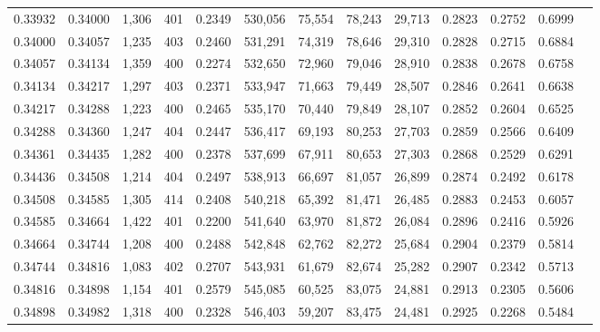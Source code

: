 \begin{tabular}{rrrrrrrrrrrrr}
0.33932 & 0.34000 &  1,306 & 401 &                                     0.2349 & 530,056 &  75,554 &  78,243 &  29,713 & 0.2823 & 0.2752 & 0.6999 \\
0.34000 & 0.34057 &  1,235 & 403 &                                     0.2460 & 531,291 &  74,319 &  78,646 &  29,310 & 0.2828 & 0.2715 & 0.6884 \\
0.34057 & 0.34134 &  1,359 & 400 &                                     0.2274 & 532,650 &  72,960 &  79,046 &  28,910 & 0.2838 & 0.2678 & 0.6758 \\
0.34134 & 0.34217 &  1,297 & 403 &                                     0.2371 & 533,947 &  71,663 &  79,449 &  28,507 & 0.2846 & 0.2641 & 0.6638 \\
0.34217 & 0.34288 &  1,223 & 400 &                                     0.2465 & 535,170 &  70,440 &  79,849 &  28,107 & 0.2852 & 0.2604 & 0.6525 \\
0.34288 & 0.34360 &  1,247 & 404 &                                     0.2447 & 536,417 &  69,193 &  80,253 &  27,703 & 0.2859 & 0.2566 & 0.6409 \\
0.34361 & 0.34435 &  1,282 & 400 &                                     0.2378 & 537,699 &  67,911 &  80,653 &  27,303 & 0.2868 & 0.2529 & 0.6291 \\
0.34436 & 0.34508 &  1,214 & 404 &                                     0.2497 & 538,913 &  66,697 &  81,057 &  26,899 & 0.2874 & 0.2492 & 0.6178 \\
0.34508 & 0.34585 &  1,305 & 414 &                                     0.2408 & 540,218 &  65,392 &  81,471 &  26,485 & 0.2883 & 0.2453 & 0.6057 \\
0.34585 & 0.34664 &  1,422 & 401 &                                     0.2200 & 541,640 &  63,970 &  81,872 &  26,084 & 0.2896 & 0.2416 & 0.5926 \\
0.34664 & 0.34744 &  1,208 & 400 &                                     0.2488 & 542,848 &  62,762 &  82,272 &  25,684 & 0.2904 & 0.2379 & 0.5814 \\
0.34744 & 0.34816 &  1,083 & 402 &                                     0.2707 & 543,931 &  61,679 &  82,674 &  25,282 & 0.2907 & 0.2342 & 0.5713 \\
0.34816 & 0.34898 &  1,154 & 401 &                                     0.2579 & 545,085 &  60,525 &  83,075 &  24,881 & 0.2913 & 0.2305 & 0.5606 \\
0.34898 & 0.34982 &  1,318 & 400 &                                     0.2328 & 546,403 &  59,207 &  83,475 &  24,481 & 0.2925 & 0.2268 & 0.5484 \\

\end{tabular}
